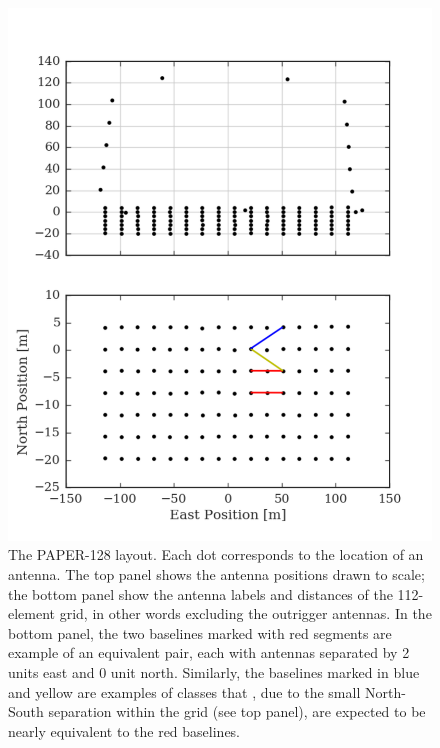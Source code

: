 \documentclass[twocolumn,apj,numberedappendix]{emulateapj}
\renewcommand\[{\begin{equation}}
\renewcommand\]{\end{equation}}
\begin{document}
\begin{figure}[H]
\includegraphics[width=\linewidth]{antconfig}

\caption{The PAPER-128 layout. Each dot corresponds to the location of
an antenna. The top panel shows the antenna positions drawn to scale;
the bottom panel show the antenna labels and distances of the 112-element grid, in other words excluding the outrigger antennas.
In the bottom panel, the two baselines marked with red segments are example of an equivalent pair, each with antennas separated by 2 units east and 0 unit north. Similarly,
the baselines marked in blue and yellow are examples
of classes that , due to the small North-South separation within the grid (see top panel), are expected to be nearly equivalent to the red baselines. }
\label{fig:AntPos}
\end{figure}
\end{document}
